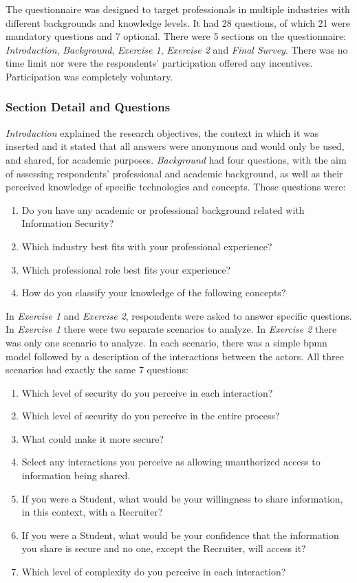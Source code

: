 The questionnaire was designed to target professionals in multiple industries with different backgrounds and knowledge levels. It had 28 questions, of which 21 were mandatory questions and 7 optional. There were 5 sections on the questionnaire: \textit{Introduction}, \textit{Background}, \textit{Exercise 1}, \textit{Exercise 2} and \textit{Final Survey}. There was no time limit nor were the respondents' participation offered any incentives. Participation was completely voluntary.

\subsubsection{Section Detail and Questions}

\textit{Introduction} explained the research objectives, the context in which it was inserted and it stated that all answers were anonymous and would only be used, and shared, for academic purposes.
%
\textit{Background} had four questions, with the aim of assessing respondents' professional and academic background, as well as their perceived knowledge of specific technologies and concepts. Those questions were:

\begin{enumerate}
	\item Do you have any academic or professional background related with Information Security?
	\item Which industry best fits with your professional experience?
	\item Which professional role best fits your experience?
	\item How do you classify your knowledge of the following concepts?
\end{enumerate}

In \textit{Exercise 1} and \textit{Exercise 2}, respondents were asked to answer specific questions. In \textit{Exercise 1} there were two separate scenarios to analyze. In \textit{Exercise 2} there was only one scenario to analyze. In each scenario, there was a simple \gls{bpmn} \cite{BPMN} model followed by a description of the interactions between the actors. All three scenarios had exactly the same 7 questions:

\begin{enumerate}
	\item Which level of security do you perceive in each interaction?
	\item Which level of security do you perceive in the entire process?
	\item What could make it more secure?
	\item Select any interactions you perceive as allowing unauthorized access to information being shared.
	\item If you were a Student, what would be your willingness to share information, in this context, with a Recruiter?
	\item  If you were a Student, what would be your confidence that the information you share is secure and no one, except the Recruiter, will access it?
	\item Which level of complexity do you perceive in each interaction?
\end{enumerate}

